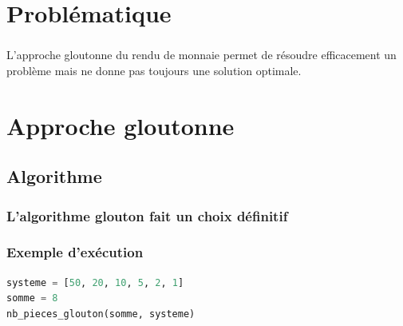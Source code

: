 \documentclass[svgnames,11pt]{beamer}
\author[]{Christophe Viroulaud}
\title{}
\date{}
\institute{Terminale NSI}
\begin{document}
\begin{frame}
\titlepage
\end{frame}
\section{Problématique}

\begin{frame}
    \frametitle{}
    L'approche gloutonne du rendu de monnaie permet de résoudre efficacement un problème mais ne donne pas toujours une solution optimale.
\begin{center}
\end{center}

\end{frame}
\section{Approche gloutonne}
\subsection{Algorithme}
\begin{frame}
    \frametitle{L'algorithme glouton fait un choix définitif}
\begin{center}
    
    \label{glouton}
\end{center}

\end{frame}
\begin{frame}[fragile]
    \frametitle{Exemple d'exécution}

    \begin{center}
        \begin{lstlisting}[language=Python]
systeme = [50, 20, 10, 5, 2, 1]
somme = 8
nb_pieces_glouton(somme, systeme)
        \end{lstlisting}
        \label{moncode}
    \end{center}
    \begin{center}
        \label{moncode}
    \end{center}
\end{frame}
\end{document}
